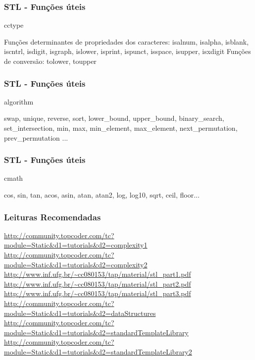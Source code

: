 \begin{frame}
\frametitle{STL - Funções úteis}
\begin{block}{cctype}
\begin{itemize}
	\bitem Funções determinantes de propriedades dos caracteres: isalnum, isalpha, isblank, iscntrl, isdigit, isgraph, islower, isprint, ispunct, isspace, isupper, isxdigit
	\bitem Funções de conversão: tolower, toupper
\end{itemize}
\end{block}
\end{frame}

\begin{frame}
\frametitle{STL - Funções úteis}
\begin{block}{algorithm}
\begin{itemize}
	\bitem swap, unique, reverse, sort, lower\_bound, upper\_bound, binary\_search, set\_intersection, min, max, min\_element, max\_element, next\_permutation, prev\_permutation ...
\end{itemize}
\end{block}
\end{frame}

\begin{frame}
\frametitle{STL - Funções úteis}
\begin{block}{cmath}
\begin{itemize}
	\bitem cos, sin, tan, acos, asin, atan, atan2, log, log10, sqrt, ceil, floor...
\end{itemize}
\end{block}
\end{frame}

\begin{frame}
\frametitle{Leituras Recomendadas}

\begin{block}{}
\begin{itemize}
\tiny
	\bitem \url{http://community.topcoder.com/tc?module=Static&d1=tutorials&d2=complexity1}
	\bitem \url{http://community.topcoder.com/tc?module=Static&d1=tutorials&d2=complexity2}
	\bitem \url{http://www.inf.ufg.br/~cc080153/tap/material/stl_part1.pdf}
	\bitem \url{http://www.inf.ufg.br/~cc080153/tap/material/stl_part2.pdf}
	\bitem \url{http://www.inf.ufg.br/~cc080153/tap/material/stl_part3.pdf}	
	\bitem \url{http://community.topcoder.com/tc?module=Static&d1=tutorials&d2=dataStructures}
	\bitem \url{http://community.topcoder.com/tc?module=Static&d1=tutorials&d2=standardTemplateLibrary}
	\bitem \url{http://community.topcoder.com/tc?module=Static&d1=tutorials&d2=standardTemplateLibrary2}
\end{itemize}
\end{block}

\end{frame}

